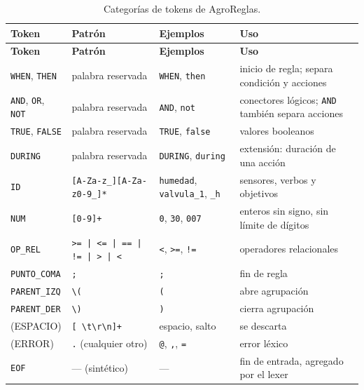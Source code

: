 \documentclass[11pt,letterpaper]{article}
\newcommand{\T}[1]{\texttt{#1}}
\newcommand{\cabeza}{\rowcolor{cabecera}}
\begin{document}
\begin{longtable}{>{\raggedright}p{2.9cm}>{\raggedright}p{4.4cm}>{\raggedright}p{3.6cm}p{4.3cm}}
\caption{Categorías de tokens de AgroReglas.}\label{tab:tokens}\\
\hline\cabeza \textbf{Token} & \textbf{Patrón} & \textbf{Ejemplos} & \textbf{Uso}\\\hline\endfirsthead
\hline\cabeza \textbf{Token} & \textbf{Patrón} & \textbf{Ejemplos} & \textbf{Uso}\\\hline\endhead
\T{WHEN}, \T{THEN} & palabra reservada & \T{WHEN}, \T{then} & inicio de regla; separa condición y acciones\\
\T{AND}, \T{OR}, \T{NOT} & palabra reservada & \T{AND}, \T{not} & conectores lógicos; \T{AND} también separa acciones\\
\T{TRUE}, \T{FALSE} & palabra reservada & \T{TRUE}, \T{false} & valores booleanos\\
\T{DURING} & palabra reservada & \T{DURING}, \T{during} & extensión: duración de una acción\\
\T{ID} & \T{[A-Za-z\_][A-Za-z0-9\_]*} & \T{humedad}, \T{valvula\_1}, \T{\_h} & sensores, verbos y objetivos\\
\T{NUM} & \T{[0-9]+} & \T{0}, \T{30}, \T{007} & enteros sin signo, sin límite de dígitos\\
\T{OP\_REL} & \T{>= | <= | == | != | > | <} & \T{<}, \T{>=}, \T{!=} & operadores relacionales\\
\T{PUNTO\_COMA} & \T{;} & \T{;} & fin de regla\\
\T{PARENT\_IZQ} & \T{\textbackslash(} & \T{(} & abre agrupación\\
\T{PARENT\_DER} & \T{\textbackslash)} & \T{)} & cierra agrupación\\
(ESPACIO) & \T{[ \textbackslash t\textbackslash r\textbackslash n]+} & espacio, salto & se descarta\\
(ERROR) & \T{.} (cualquier otro) & \T{@}, \T{,}, \T{=} & error léxico\\
\T{EOF} & --- (sintético) & --- & fin de entrada, agregado por el lexer\\\hline
\end{longtable}
\end{document}
